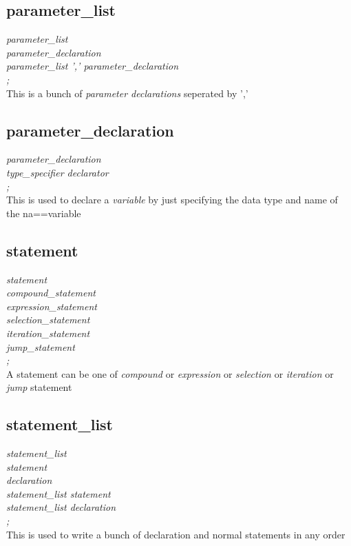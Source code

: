 \documentclass[11pt]{article}
\begin{document}
\subsection{parameter\_list}
{\itshape
parameter\_list\\
\hspace*{1cm} parameter\_declaration\\
\hspace*{1cm}   parameter\_list ',' parameter\_declaration\\
\hspace*{1cm};\\
}
This is a bunch of \textit{parameter declarations } seperated by ','
\subsection{parameter\_declaration}
{\itshape
parameter\_declaration\\
\hspace*{1cm} type\_specifier declarator\\
\hspace*{1cm};\\
}
This is used to declare a \textit{variable} by just specifying the data type and name of the na==variable
\subsection{statement}
{\itshape
statement\\
\hspace*{1cm} compound\_statement\\
\hspace*{1cm}   expression\_statement\\
\hspace*{1cm}   selection\_statement\\
\hspace*{1cm}   iteration\_statement\\
\hspace*{1cm}   jump\_statement\\
\hspace*{1cm};\\
}
A statement can be one of \textit{compound} or \textit{expression} or \textit{selection} or \textit{iteration} or \textit{jump} statement
\subsection{statement\_list}
{\itshape
statement\_list\\
\hspace*{1cm} statement\\
\hspace*{1cm}   declaration\\
\hspace*{1cm}   statement\_list statement\\
\hspace*{1cm}   statement\_list declaration\\
\hspace*{1cm};\\
}
This is used to write a bunch of declaration and normal statements in any order
\end{document}
